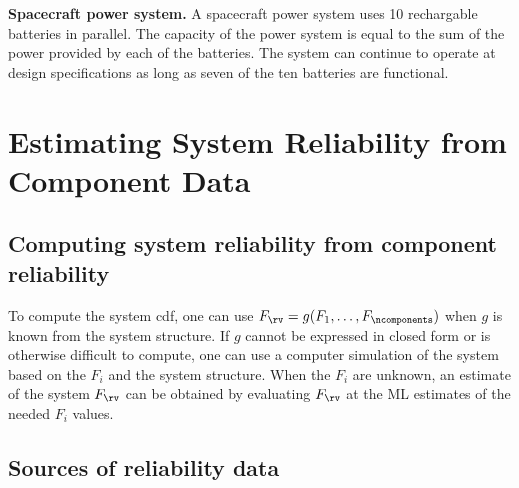 \begin{example} {\bf Spacecraft power system.}
A spacecraft power system uses 10 rechargable batteries in parallel.
The capacity of the power system is equal to the sum of
the power provided by each of the batteries. The system can continue
to operate at design specifications as long as seven of the ten
batteries are functional.
\end{example}

\section{Estimating System Reliability from Component Data}
\label{section:est.sys.rel}
\subsection{Computing system reliability from component reliability}

To compute the system cdf, one can use $F_{\rv}=g(F_{1}, \ldots,
F_{\ncomponents})$ when $g$ is known from the system structure.
If $g$ cannot be expressed in closed form or is otherwise difficult to
compute, one can use a computer simulation of the system based on the
$F_{i}$ and the system structure.  When the $F_{i}$ are unknown, an
estimate of the system $F_{\rv}$ can be obtained by evaluating
$F_{\rv}$ at the ML estimates of the needed $F_{i}$ values.

\subsection{Sources of reliability data}

